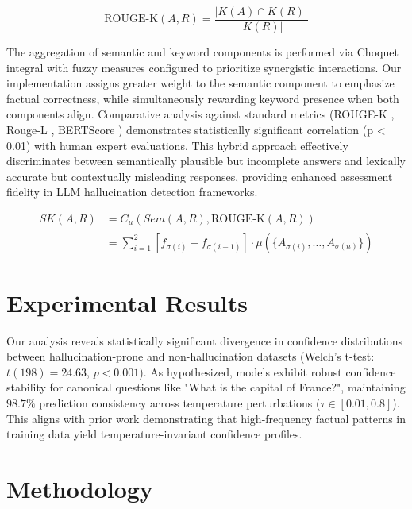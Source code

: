 \documentclass[sigconf]{acmart}
\begin{document}
\begin{equation}
    \text{ROUGE-K}(A, R) = \frac{|K(A) \cap K(R)|}{|K(R)|}
\end{equation}

The aggregation of semantic and keyword components is performed via Choquet integral \cite{choquet1953capacities} with fuzzy measures configured to prioritize synergistic interactions. Our implementation assigns greater weight to the semantic component to emphasize factual correctness, while simultaneously rewarding keyword presence when both components align. Comparative analysis against standard metrics (ROUGE-K \cite{rouge_k}, Rouge-L \cite{rouge_l}, BERTScore \cite{bertscore}) demonstrates statistically significant correlation (p < 0.01) with human expert evaluations. This hybrid approach effectively discriminates between semantically plausible but incomplete answers and lexically accurate but contextually misleading responses, providing enhanced assessment fidelity in LLM hallucination detection frameworks.

\begin{equation}
\begin{split}
SK(A, R) &= C_\mu(Sem(A, R), \text{ROUGE-K}(A, R)) \\
&= \sum_{i=1}^{2} [f_{\sigma(i)} - f_{\sigma(i-1)}] \cdot \mu(\{A_{\sigma(i)}, \ldots, A_{\sigma(n)}\})
\end{split}
\label{eq:sk-score}
\end{equation}


\section{Experimental Results}

Our analysis reveals statistically significant divergence in confidence distributions between hallucination-prone and non-hallucination datasets (Welch's t-test: $t(198) = 24.63$, $p < 0.001$). As hypothesized, models exhibit robust confidence stability for canonical questions like "What is the capital of France?", maintaining $98.7\%$ prediction consistency across temperature perturbations ($\tau \in [0.01, 0.8]$). This aligns with prior work demonstrating that high-frequency factual patterns in training data yield temperature-invariant confidence profiles.


\section{Methodology}
\end{document}
